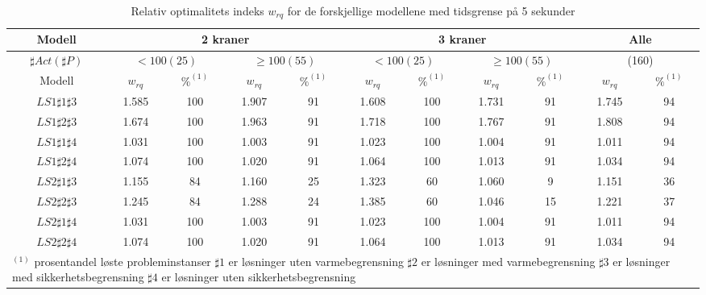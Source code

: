 \begin{table}[!h]
\caption{Relativ optimalitets indeks $w_{rq}$ for de forskjellige modellene med tidsgrense på 5 sekunder}
\begin{center}
\begin{tabular}{ | c | c | c | c | c | c | c | c | c | c | c | }
\hline
\textbf{Modell} & \multicolumn{4}{|c|}{\textbf{2 kraner}} & \multicolumn{4}{|c|}{\textbf{3 kraner}} & \multicolumn{2}{|c|}{\textbf{Alle}} \\ \hline
$\sharp Act(\sharp P)$ & \multicolumn{2}{|c|}{$< 100 (25)$} & \multicolumn{2}{|c|}{$\ge 100 (55)$} & \multicolumn{2}{|c|}{$< 100 (25)$} & \multicolumn{2}{|c|}{$\ge 100 (55)$} & \multicolumn{2}{|c|}{(160)} \\ 
\hline
Modell & $w_{rq}$ & $\%^{(1)}$ & $w_{rq}$ & $\%^{(1)}$  & $w_{rq}$ & $\%^{(1)}$ & $w_{rq}$ & $\%^{(1)}$ & $w_{rq}$ & $\%^{(1)}$ \\ \hline
$LS1 \sharp 1\sharp 3$ & 1.585 & 100 & 1.907 & 91 & 1.608 & 100 & 1.731 & 91 & 1.745 & 94 \\
$LS1 \sharp 2\sharp 3$ & 1.674 & 100 & 1.963 & 91 & 1.718 & 100 & 1.767 & 91 & 1.808 & 94 \\
$LS1 \sharp 1\sharp 4$ & 1.031 & 100 & 1.003 & 91 & 1.023 & 100 & 1.004 & 91 & 1.011 & 94 \\
$LS1 \sharp 2\sharp 4$ & 1.074 & 100 & 1.020 & 91 & 1.064 & 100 & 1.013 & 91 & 1.034 & 94 \\
$LS2 \sharp 1\sharp 3$ & 1.155 & 84 & 1.160 & 25 & 1.323 & 60 & 1.060 & 9 & 1.151 & 36 \\
$LS2 \sharp 2\sharp 3$ & 1.245 & 84 & 1.288 & 24 & 1.385 & 60 & 1.046 & 15 & 1.221 & 37 \\
$LS2 \sharp 1\sharp 4$ & 1.031 & 100 & 1.003 & 91 & 1.023 & 100 & 1.004 & 91 & 1.011 & 94 \\
$LS2 \sharp 2\sharp 4$ & 1.074 & 100 & 1.020 & 91 & 1.064 & 100 & 1.013 & 91 & 1.034 & 94 \\
\hline
\multicolumn{11}{l}{\begin{minipage}{6in}$^{(1)}$ prosentandel løste probleminstanser\newline
$\sharp 1$ er løsninger uten varmebegrensning\newline
$\sharp 2$ er løsninger med varmebegrensning \newline
$\sharp 3$ er løsninger med sikkerhetsbegrensning \newline
$\sharp 4$ er løsninger uten sikkerhetsbegrensning\end{minipage}}
\end{tabular}
\end{center}
\label{tab:resultaterSum5s}
\end{table}


